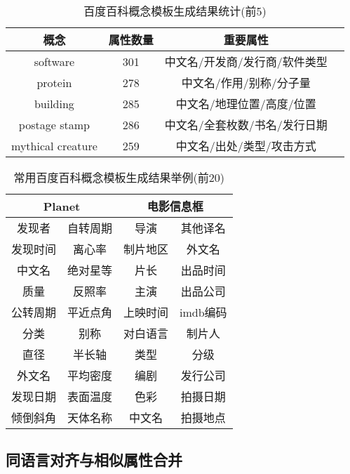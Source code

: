 \begin{table}[htb]
  \centering
  \caption{百度百科概念模板生成结果统计(前5)}
  \label{tab:baidu-template-stat}
    \begin{tabular}{cccc}
      \toprule[1.5pt]
         概念 & 属性数量 & 重要属性\\ \midrule[1pt]
         software      & 301  &  中文名/开发商/发行商/软件类型\\
         protein       & 278  & 中文名/作用/别称/分子量       \\
         building      & 285  & 中文名/地理位置/高度/位置     \\
         postage stamp & 286  & 中文名/全套枚数/书名/发行日期 \\
         mythical creature  & 259 & 中文名/出处/类型/攻击方式 \\
      \bottomrule[1.5pt]
    \end{tabular}
\end{table}

\begin{table}[htb]
  \centering
  \caption{常用百度百科概念模板生成结果举例(前20)}
  \label{tab:baidu-template-examples}
    \begin{tabular}{cccc}
      \toprule[1.5pt]
         \multicolumn{2}{c}{Planet} & \multicolumn{2}{c}{电影信息框}\\ \midrule[1pt]
         发现者   &  自转周期  & 导演     & 其他译名 \\
         发现时间 &  离心率    & 制片地区 & 外文名   \\
         中文名   &  绝对星等  & 片长     & 出品时间 \\
         质量     &  反照率    & 主演     & 出品公司 \\
         公转周期 &  平近点角  & 上映时间 & imdb编码 \\
         分类     &  别称      & 对白语言 & 制片人   \\
         直径     &  半长轴    & 类型     & 分级     \\
         外文名   &  平均密度  & 编剧     & 发行公司 \\
         发现日期 &  表面温度  & 色彩     & 拍摄日期 \\
         倾倒斜角 &  天体名称  & 中文名   & 拍摄地点 \\
      \bottomrule[1.5pt]
    \end{tabular}
\end{table}

\subsection{同语言对齐与相似属性合并}
\label{sec:similar-property}

